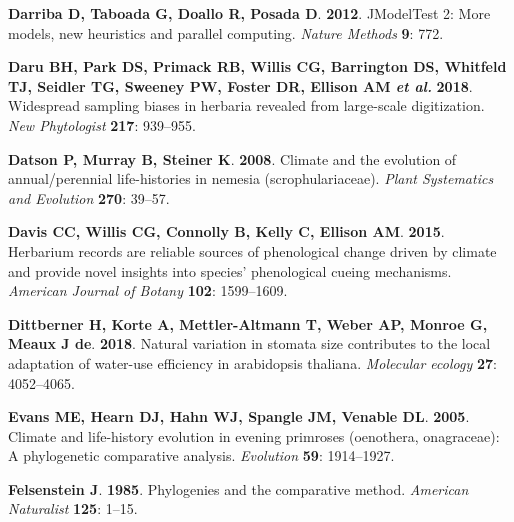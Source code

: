 \documentclass[man,floatsintext]{apa6}
\theoremstyle{definition}
\theoremstyle{definition}
\theoremstyle{definition}
\theoremstyle{remark}
\begin{document}
\leavevmode\hypertarget{ref-darriba2012jmodeltest}{}%
\textbf{\textnormal{Darriba D}, \textnormal{Taboada G},
\textnormal{Doallo R}, \textnormal{Posada D}}. \textbf{2012}. JModelTest
2: More models, new heuristics and parallel computing. \emph{Nature
Methods} \textbf{9}: 772.

\leavevmode\hypertarget{ref-daru2018widespread}{}%
\textbf{\textnormal{Daru BH}, \textnormal{Park DS}, \textnormal{Primack
RB}, \textnormal{Willis CG}, \textnormal{Barrington DS},
\textnormal{Whitfeld TJ}, \textnormal{Seidler TG}, \textnormal{Sweeney
PW}, \textnormal{Foster DR}, \textnormal{Ellison AM} \emph{et al.}}
\textbf{2018}. Widespread sampling biases in herbaria revealed from
large-scale digitization. \emph{New Phytologist} \textbf{217}: 939--955.

\leavevmode\hypertarget{ref-datson2008climate}{}%
\textbf{\textnormal{Datson P}, \textnormal{Murray B},
\textnormal{Steiner K}}. \textbf{2008}. Climate and the evolution of
annual/perennial life-histories in nemesia (scrophulariaceae).
\emph{Plant Systematics and Evolution} \textbf{270}: 39--57.

\leavevmode\hypertarget{ref-davis2015herbarium}{}%
\textbf{\textnormal{Davis CC}, \textnormal{Willis CG},
\textnormal{Connolly B}, \textnormal{Kelly C}, \textnormal{Ellison AM}}.
\textbf{2015}. Herbarium records are reliable sources of phenological
change driven by climate and provide novel insights into species'
phenological cueing mechanisms. \emph{American Journal of Botany}
\textbf{102}: 1599--1609.

\leavevmode\hypertarget{ref-dittberner2018natural}{}%
\textbf{\textnormal{Dittberner H}, \textnormal{Korte A},
\textnormal{Mettler-Altmann T}, \textnormal{Weber AP},
\textnormal{Monroe G}, \textnormal{Meaux J de}}. \textbf{2018}. Natural
variation in stomata size contributes to the local adaptation of
water-use efficiency in arabidopsis thaliana. \emph{Molecular ecology}
\textbf{27}: 4052--4065.

\leavevmode\hypertarget{ref-evans2005climate}{}%
\textbf{\textnormal{Evans ME}, \textnormal{Hearn DJ}, \textnormal{Hahn
WJ}, \textnormal{Spangle JM}, \textnormal{Venable DL}}. \textbf{2005}.
Climate and life-history evolution in evening primroses (oenothera,
onagraceae): A phylogenetic comparative analysis. \emph{Evolution}
\textbf{59}: 1914--1927.

\leavevmode\hypertarget{ref-felsenstein1985phylogenies}{}%
\textbf{\textnormal{Felsenstein J}}. \textbf{1985}. Phylogenies and the
comparative method. \emph{American Naturalist} \textbf{125}: 1--15.
\end{document}
